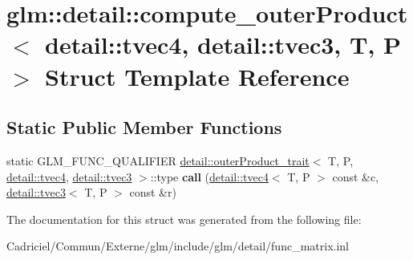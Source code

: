 \hypertarget{structglm_1_1detail_1_1compute__outer_product_3_01detail_1_1tvec4_00_01detail_1_1tvec3_00_01_t_00_01_p_01_4}{}\section{glm\+:\+:detail\+:\+:compute\+\_\+outer\+Product$<$ detail\+:\+:tvec4, detail\+:\+:tvec3, T, P $>$ Struct Template Reference}
\label{structglm_1_1detail_1_1compute__outer_product_3_01detail_1_1tvec4_00_01detail_1_1tvec3_00_01_t_00_01_p_01_4}
\subsection*{Static Public Member Functions}
\begin{DoxyCompactItemize}
\item 
static G\+L\+M\+\_\+\+F\+U\+N\+C\+\_\+\+Q\+U\+A\+L\+I\+F\+I\+ER \hyperlink{structglm_1_1detail_1_1outer_product__trait}{detail\+::outer\+Product\+\_\+trait}$<$ T, P, \hyperlink{structglm_1_1detail_1_1tvec4}{detail\+::tvec4}, \hyperlink{structglm_1_1detail_1_1tvec3}{detail\+::tvec3} $>$\+::type {\bfseries call} (\hyperlink{structglm_1_1detail_1_1tvec4}{detail\+::tvec4}$<$ T, P $>$ const \&c, \hyperlink{structglm_1_1detail_1_1tvec3}{detail\+::tvec3}$<$ T, P $>$ const \&r)\hypertarget{structglm_1_1detail_1_1compute__outer_product_3_01detail_1_1tvec4_00_01detail_1_1tvec3_00_01_t_00_01_p_01_4_a7e5367e91d2b8d7863f6e5b277317c45}{}\label{structglm_1_1detail_1_1compute__outer_product_3_01detail_1_1tvec4_00_01detail_1_1tvec3_00_01_t_00_01_p_01_4_a7e5367e91d2b8d7863f6e5b277317c45}

\end{DoxyCompactItemize}


The documentation for this struct was generated from the following file\+:\begin{DoxyCompactItemize}
\item 
Cadriciel/\+Commun/\+Externe/glm/include/glm/detail/func\+\_\+matrix.\+inl\end{DoxyCompactItemize}
